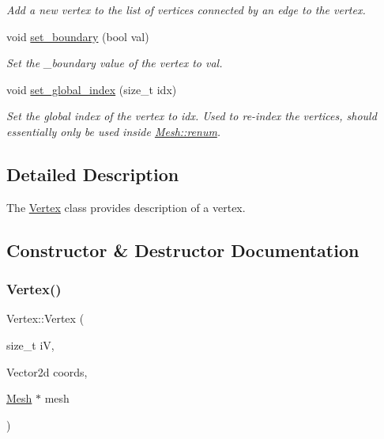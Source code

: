 \begin{DoxyCompactItemize}
\begin{DoxyCompactList}\small\item\em Add a new vertex to the list of vertices connected by an edge to the vertex. \end{DoxyCompactList}\item 
\mbox{\label{classHArDCore2D_1_1Vertex_a72fa3131022cb2c847a2e9d5b56cb893}} 
void \hyperlink{classHArDCore2D_1_1Vertex_a72fa3131022cb2c847a2e9d5b56cb893}{set\+\_\+boundary} (bool val)
\begin{DoxyCompactList}\small\item\em Set the \+\_\+boundary value of the vertex to val. \end{DoxyCompactList}\item 
\mbox{\label{classHArDCore2D_1_1Vertex_a1acf4d7072729d8f5f89876383361099}} 
void \hyperlink{classHArDCore2D_1_1Vertex_a1acf4d7072729d8f5f89876383361099}{set\+\_\+global\+\_\+index} (size\+\_\+t idx)
\begin{DoxyCompactList}\small\item\em Set the global index of the vertex to idx. Used to re-\/index the vertices, should essentially only be used inside \hyperlink{classHArDCore2D_1_1Mesh_af77873bbc892a7a5b37bf4773c55aefc}{Mesh\+::renum}. \end{DoxyCompactList}\end{DoxyCompactItemize}


\subsection{Detailed Description}
The \hyperlink{classHArDCore2D_1_1Vertex}{Vertex} class provides description of a vertex. 

\subsection{Constructor \& Destructor Documentation}
\mbox{\label{classHArDCore2D_1_1Vertex_ab33652b8567bb0f58514262839506ec4}} 
\subsubsection{\texorpdfstring{Vertex()}{Vertex()}}
{\footnotesize\ttfamily Vertex\+::\+Vertex (\begin{DoxyParamCaption}\item[{size\+\_\+t}]{iV,  }\item[{Vector2d}]{coords,  }\item[{\hyperlink{classHArDCore2D_1_1Mesh}{Mesh} $\ast$}]{mesh }\end{DoxyParamCaption})}

